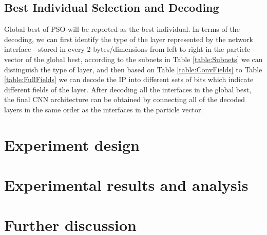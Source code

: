 \documentclass[conference]{IEEEtran}
\begin{document}
\subsection{Best Individual Selection and Decoding}

Global best of PSO will be reported as the best individual. In terms of the decoding, we can first identify the type of the layer represented by the network interface - stored in every 2 bytes/dimensions from left to right in the particle vector of the global best, according to the subnets in Table \ref{table:Subnets} we can distinguish the type of layer, and then based on Table \ref{table:ConvFields} to Table \ref{table:FullFields} we can decode the IP into different sets of bits which indicate different fields of the layer. After decoding all the interfaces in the global best, the final CNN architecture can be obtained by connecting all of the decoded layers in the same order as the interfaces in the particle vector. 

\section{Experiment design}


\section{Experimental results and analysis}


\section{Further discussion}



%
%
\end{document}

